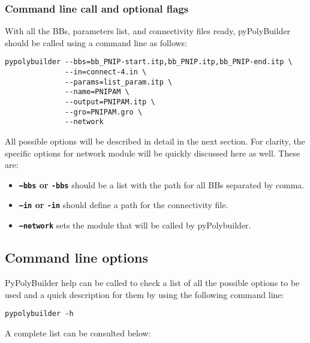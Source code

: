 \documentclass[12pt]{article}
\begin{document}
\subsubsection{Command line call and optional flags}
With all the BBs, parameters list, and connectivity files ready, pyPolyBuilder should be called using a command line as follows:

\begin{lstlisting}
pypolybuilder --bbs=bb_PNIP-start.itp,bb_PNIP.itp,bb_PNIP-end.itp \
              --in=connect-4.in \
              --params=list_param.itp \
              --name=PNIPAM \
              --output=PNIPAM.itp \
              --gro=PNIPAM.gro \
              --network
\end{lstlisting}

All possible options will be described in detail in the next section.
For clarity, the specific options for network module will be quickly discussed here as well.
These are:
\begin{itemize}
    \item \textbf{\texttt{--bbs} or \texttt{-bbs}} should be a list with the path for all BBs separated by comma.
    
    \item \textbf{\texttt{--in} or \texttt{-in}} should define a path for the connectivity file.
    
    \item \textbf{\texttt{--network}} sets the module that will be called by pyPolybuilder.
\end{itemize}

\subsection{Command line options}
\label{sec:CommandLine}

PyPolyBuilder help can be called to check a list of all the possible options to be used and a quick description for them by using the following command line:

\begin{lstlisting}
pypolybuilder -h
\end{lstlisting}

A complete list can be consulted below:
\end{document}
